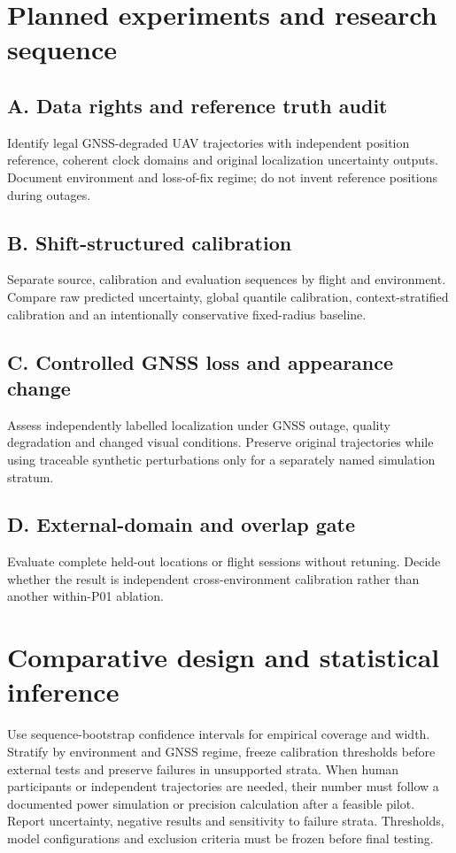 \documentclass[11pt,a4paper]{article}
\begin{document}
\section{Planned experiments and research sequence}
\subsection{A. Data rights and reference truth audit}
Identify legal GNSS-degraded UAV trajectories with independent position reference, coherent clock domains and original localization uncertainty outputs. Document environment and loss-of-fix regime; do not invent reference positions during outages.

\subsection{B. Shift-structured calibration}
Separate source, calibration and evaluation sequences by flight and environment. Compare raw predicted uncertainty, global quantile calibration, context-stratified calibration and an intentionally conservative fixed-radius baseline.

\subsection{C. Controlled GNSS loss and appearance change}
Assess independently labelled localization under GNSS outage, quality degradation and changed visual conditions. Preserve original trajectories while using traceable synthetic perturbations only for a separately named simulation stratum.

\subsection{D. External-domain and overlap gate}
Evaluate complete held-out locations or flight sessions without retuning. Decide whether the result is independent cross-environment calibration rather than another within-P01 ablation.

\section{Comparative design and statistical inference}
Use sequence-bootstrap confidence intervals for empirical coverage and width. Stratify by environment and GNSS regime, freeze calibration thresholds before external tests and preserve failures in unsupported strata. When human participants or independent trajectories are needed, their number must follow a documented power simulation or precision calculation after a feasible pilot. Report uncertainty, negative results and sensitivity to failure strata. Thresholds, model configurations and exclusion criteria must be frozen before final testing.
\end{document}
